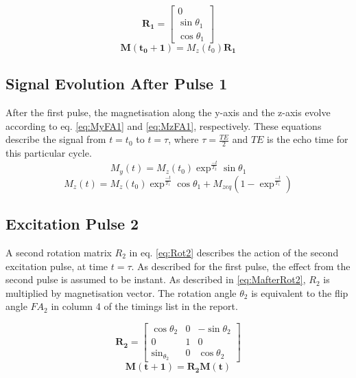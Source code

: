 \begin{equation} \label{eq:Rot1}
\boldsymbol{R_{1}} =
\begin{bmatrix}
0 \\
 \sin{\theta_{1}}  \\
\cos{\theta_{1}}
 \end{bmatrix}
\end{equation}
\begin{equation} \label{eq:MafterRot1}
\boldsymbol{M(t_{0} + 1)} = M_{z}{(t_{0})} \boldsymbol{R_{1}} 
\end{equation}
\subsection{Signal Evolution After Pulse 1}
After the first pulse, the magnetisation along the y-axis and the z-axis evolve according to eq. \ref{eq:MyFA1} and \ref{eq:MzFA1}, respectively. These equations describe the signal from $t = t_{0}$ to $t =  \tau$, where $\tau = \frac{TE}{2}$ and $TE$ is the echo time for this particular cycle.
\begin{equation}  \label{eq:MyFA1}
M_{y}(t) = M_{z}(t_{0})\exp^{\frac{-t}{T_{2}}}\sin{\theta_{1}}
\end{equation}
\begin{equation} \label{eq:MzFA1}
M_{z}(t) = M_{z}(t_{0})\exp^{\frac{-t}{T_{1}}}\cos{\theta_{1}} + M_{zeq}(1-\exp^{\frac{-t}{T_{1}}})
\end{equation}

\subsection{Excitation Pulse 2}
A second rotation matrix $R_{2}$ in eq. \ref{eq:Rot2} describes the action of the second excitation pulse, at time $t = \tau$. As described for the first pulse, the effect from the second pulse is assumed to be instant. As described in \ref{eq:MafterRot2}, $R_{2}$ is multiplied by magnetisation vector. The rotation angle $\theta_{2}$ is equivalent to the flip angle $FA_{2}$ in column 4 of the timings list in the report.

\begin{equation} \label{eq:Rot2}
\boldsymbol{R_{2}} =
\begin{bmatrix}
\cos{\theta_{2}} & 0 & -\sin{\theta_{2}}\\
0 & 1 & 0 \\
\sin_{\theta_{2}} & 0 &\cos{\theta_{2}}
 \end{bmatrix}
\end{equation}
\begin{equation} \label{eq:MafterRot2}
\boldsymbol{M(t + 1)} = \boldsymbol{R_{2}} \boldsymbol{M(t)}
\end{equation}
